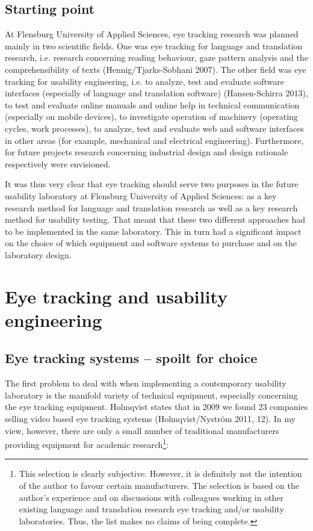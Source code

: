 \begin{
}[h]
\section{Starting point}

At Flensburg University of Applied Sciences, eye tracking research was planned mainly in two scientific fields. One was eye tracking for language and translation research, i.e. research concerning reading behaviour, gaze pattern analysis and the comprehensibility of texts (Hennig/Tjarks-Sobhani 2007). The other field was eye tracking for usability engineering, i.e. to analyze, test and evaluate software interfaces (especially of language and translation software) (Hansen-Schirra 2013), to test and evaluate online manuals and online help in technical communication (especially on mobile devices), to investigate operation of machinery (operating cycles, work processes), to analyze, test and evaluate web and software interfaces in other areas (for example, mechanical and electrical engineering). Furthermore, for future projects research concerning industrial design and design rationale respectively were envisioned.

\begin{styleBodyTextIndent}
It was thus very clear that eye tracking should serve two purposes in the future usability laboratory at Flensburg University of Applied Sciences: as a key research method for language and translation research as well as a key research method for usability testing. That meant that these two different approaches had to be implemented in the same laboratory. This in turn had a significant impact on the choice of which equipment and software systems to purchase and on the laboratory design.
\end{styleBodyTextIndent}

\chapter{Eye tracking and usability engineering }

\section{Eye tracking systems – spoilt for choice }

The first problem to deal with when implementing a contemporary usability laboratory is the manifold variety of technical equipment, especially concerning the eye tracking equipment. Holmqvist states that {\textquotedbl}in 2009 we found 23 companies selling video based eye tracking systems{\textquotedbl} (Holmqvist/Nyström 2011, 12). In my view, however, there are only a small number of traditional manufacturers providing equipment for academic research\footnote{ This selection is clearly subjective. However, it is definitely not the intention of the author to favour certain manufacturers. The selection is based on the author’s experience and on discussions with colleagues working in other existing language and translation research eye tracking and/or usability laboratories. Thus, the list makes no claims of being complete.}: 


\end{
}
